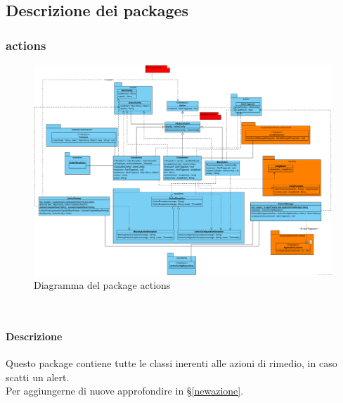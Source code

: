 		
\subsection{Descrizione dei packages}

	\subsubsection{actions}
	
		\begin{figure}[H]
       		\centering
        	\includegraphics[width=\textwidth]{./img/DiagrammiClasse/actions.png}
        	\caption[Diagramma del package actions]{Diagramma del package actions}
       	\end{figure}\\

		\paragraph*{Descrizione}
			Questo package contiene tutte le classi inerenti alle azioni di rimedio, in 
			caso scatti un alert.\\
			Per aggiungerne di nuove approfondire in §\ref{newazione}.
		
